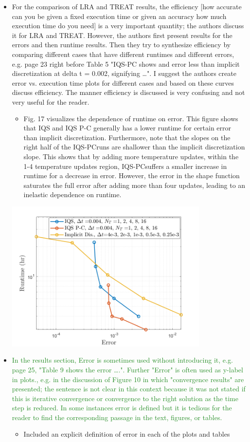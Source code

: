 \documentclass{elsarticle}
\newcommand{\iqspc}{IQS-PC}
\newcommand{\done}{\checkmark}
\newcommand{\easy}[1]{\textcolor{ForestGreen}{#1}}
\newcommand{\medm}[1]{\textcolor{BurntOrange}{#1}}
\begin{document}
\begin{itemize}
\item[\done] \medm{ For the comparison of LRA and TREAT results, the efficiency [how accurate can you be given a fixed execution time or given an accuracy how much execution time do you need] is a very important quantity; the authors discuss it for LRA and TREAT. However, the authors first present results for the errors and then runtime results. Then they try to synthesize efficiency by comparing different cases that have different runtimes and different errors, e.g. page 23 right before Table 5 "IQS-PC shows and error less than implicit discretization at delta t = 0.002, signifying …". I suggest the authors create error vs. execution time plots for different cases and based on these curves discuss efficiency. The manner efficiency is discussed is very confusing and not very useful for the reader. }
\begin{itemize}
\item Fig. 17 visualizes the dependence of runtime on error. This figure shows that IQS and IQS P-C generally has a lower runtime for certain error than implicit discretization. Furthermore, note that the slopes on the right half of the \iqspc runs are shallower than the implicit discretization slope. This shows that by adding more temperature updates, within the 1-4 temperature updates region, \iqspc suffers a smaller increase in runtime for a decrease in error. However, the error in the shape function saturates the full error after adding more than four updates, leading to an inelastic dependence on runtime. 
\end{itemize}
\includegraphics[height=3in]{figures/lra_rt_vs_err.png}


\item[\done] \easy{ In the results section, Error is sometimes used without introducing it, e.g. page 25, "Table 9 shows the error ….". Further "Error" is often used as y-label in plots., e.g. in the discussion of Figure 10 in which "convergence results" are presented; the sentence is not clear in this context because it was not stated if this is iterative convergence or convergence to the right solution as the time step is reduced. In some instances error is defined but it is tedious for the reader to find the corresponding passage in the text, figures, or tables. }
\begin{itemize}
\item Included an explicit definition of error in each of the plots and tables
\end{itemize}


\end{itemize}
\end{document}
